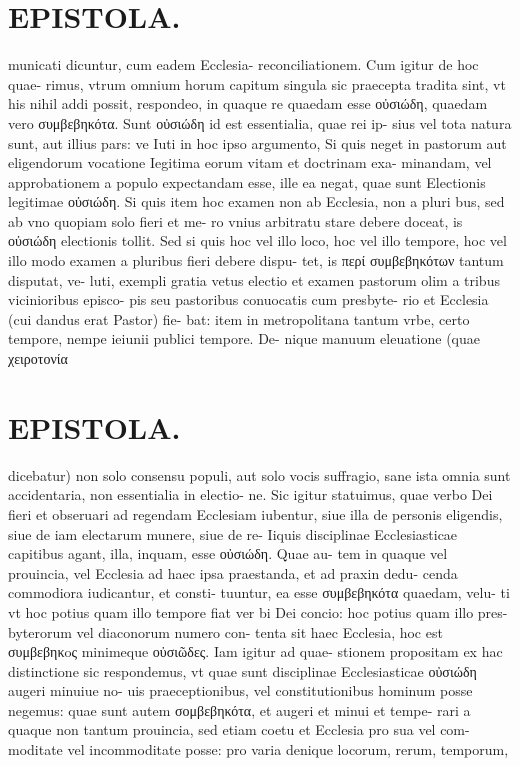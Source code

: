 \documentclass{article}
\begin{document}
\begin{pages}
\section*{EPISTOLA. }municati dicuntur, cum eadem Ecclesia- reconciliationem. Cum igitur de hoc quae- rimus, vtrum omnium horum capitum singula sic praecepta tradita sint, vt his nihil addi possit, respondeo, in quaque re quaedam esse οὐσιώδη, quaedam vero συμβεβηκότα. Sunt οὐσιώδη id est essentialia, quae rei ip- sius vel tota natura sunt, aut illius pars: ve Iuti in hoc ipso argumento, Si quis neget in pastorum aut eligendorum vocatione Iegitima eorum vitam et doctrinam exa- minandam, vel approbationem a populo expectandam esse, ille ea negat, quae sunt Electionis legitimae οὐσιώδη. Si quis item hoc examen non ab Ecclesia, non a pluri bus, sed ab vno quopiam solo fieri et me- ro vnius arbitratu stare debere doceat, is οὐσιώδη electionis tollit. Sed si quis hoc vel illo loco, hoc vel illo tempore, hoc vel illo modo examen a pluribus  fieri debere dispu- tet, is περί συμβεβηκότων tantum disputat, ve- luti, exempli gratia vetus electio et examen pastorum olim a tribus vicinioribus episco- pis seu pastoribus conuocatis cum presbyte- rio et Ecclesia (cui dandus erat Pastor) fie- bat: item in metropolitana tantum vrbe, certo tempore, nempe ieiunii publici tempore. De- nique manuum eleuatione (quae χειροτονία 
\section*{EPISTOLA. }dicebatur) non solo consensu populi, aut solo vocis suffragio, sane ista omnia sunt accidentaria, non essentialia in electio- ne. Sic igitur statuimus, quae verbo Dei fieri et obseruari ad regendam Ecclesiam iubentur, siue illa de personis eligendis, siue de iam electarum munere, siue de re- Iiquis disciplinae Ecclesiasticae capitibus agant, illa, inquam, esse οὐσιώδη. Quae au- tem in quaque vel prouincia, vel Ecclesia ad haec ipsa praestanda, et ad praxin dedu- cenda commodiora iudicantur, et consti- tuuntur, ea esse συμβεβηκότα quaedam, velu- ti vt hoc potius quam illo tempore fiat ver bi Dei concio: hoc potius quam illo pres- byterorum vel diaconorum numero con- tenta sit haec Ecclesia, hoc est συμβεβηκoς minimeque οὐσιῶδες. Iam igitur ad quae- stionem propositam ex hac distinctione sic respondemus, vt quae sunt disciplinae Ecclesiasticae οὐσιώδη augeri minuiue no- uis praeceptionibus, vel constitutionibus hominum posse negemus: quae sunt autem σομβεβηκότα, et augeri et minui et tempe- rari a quaque non tantum prouincia, sed etiam coetu et Ecclesia pro sua vel com- moditate vel incommoditate posse: pro varia denique locorum, rerum, temporum, 

\end{pages}
\end{document}
